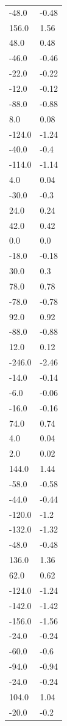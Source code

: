\begin{longtable}{ll}
-48.0 & -0.48 \\
156.0 & 1.56 \\
48.0 & 0.48 \\
-46.0 & -0.46 \\
-22.0 & -0.22 \\
-12.0 & -0.12 \\
-88.0 & -0.88 \\
8.0 & 0.08 \\
-124.0 & -1.24 \\
-40.0 & -0.4 \\
-114.0 & -1.14 \\
4.0 & 0.04 \\
-30.0 & -0.3 \\
24.0 & 0.24 \\
42.0 & 0.42 \\
0.0 & 0.0 \\
-18.0 & -0.18 \\
30.0 & 0.3 \\
78.0 & 0.78 \\
-78.0 & -0.78 \\
92.0 & 0.92 \\
-88.0 & -0.88 \\
12.0 & 0.12 \\
-246.0 & -2.46 \\
-14.0 & -0.14 \\
-6.0 & -0.06 \\
-16.0 & -0.16 \\
74.0 & 0.74 \\
4.0 & 0.04 \\
2.0 & 0.02 \\
144.0 & 1.44 \\
-58.0 & -0.58 \\
-44.0 & -0.44 \\
-120.0 & -1.2 \\
-132.0 & -1.32 \\
-48.0 & -0.48 \\
136.0 & 1.36 \\
62.0 & 0.62 \\
-124.0 & -1.24 \\
-142.0 & -1.42 \\
-156.0 & -1.56 \\
-24.0 & -0.24 \\
-60.0 & -0.6 \\
-94.0 & -0.94 \\
-24.0 & -0.24 \\
104.0 & 1.04 \\
-20.0 & -0.2 \\

\end{longtable}
